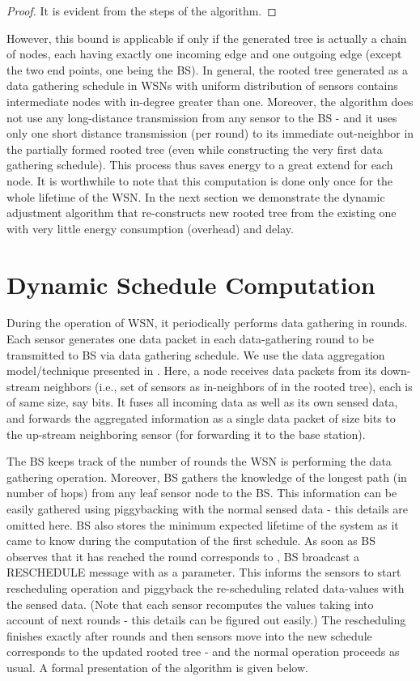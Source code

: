 \documentclass[10pt]{llncs}
\begin{document}
\begin{proof}
It is evident from the steps of the algorithm.
\end{proof}

However, this  bound is applicable if only if the generated tree is actually a chain of  nodes, each having exactly one incoming edge and one outgoing edge (except the two end points, one being the BS). In general, the rooted tree generated as a data gathering schedule in WSNs with uniform distribution of sensors contains intermediate nodes with in-degree greater than one. Moreover, the algorithm does not use any long-distance transmission from any sensor to the BS - and it uses only one short distance transmission (per round) to its immediate out-neighbor in the partially formed rooted tree (even while constructing the very first data gathering schedule). This process thus saves energy to a great extend for each node. It is worthwhile to note that this computation is done only once for the whole lifetime of the WSN. In the next section we demonstrate the dynamic adjustment algorithm that re-constructs new rooted tree from the existing one with very little energy consumption (overhead) and delay. 

\section{Dynamic Schedule Computation}

During the operation of WSN, it periodically performs data gathering in rounds. Each sensor generates one data packet in each data-gathering round to be transmitted to BS via data gathering schedule. We use the data aggregation model/technique presented in \cite{Lindsey02}. Here, a node  receives data packets from its down-stream neighbors (i.e., set of sensors as in-neighbors of  in the rooted tree), each is of same size, say  bits. It fuses all incoming data as well as its own sensed data, and forwards the aggregated information as a single data packet of size  bits to the up-stream neighboring sensor  (for forwarding it to the base station).

The BS keeps track of the number of rounds the WSN is performing the data gathering operation. Moreover, BS gathers the knowledge of the longest path  (in number of hops) from any leaf sensor node to the BS. This information can be easily gathered using piggybacking with the normal sensed data - this details are omitted here. BS also stores the minimum expected lifetime  of the system as it came to know during the computation of the first schedule. As soon as BS observes that it has reached the round corresponds to , BS broadcast a RESCHEDULE message with  as a parameter. This informs the sensors to start rescheduling operation and piggyback the re-scheduling related data-values with the sensed data. (Note that each sensor recomputes the  values taking into account of next  rounds - this details can be figured out easily.) The rescheduling finishes exactly after  rounds and then sensors move into the new schedule corresponds to the updated rooted tree - and the normal operation proceeds as usual. A formal presentation of the algorithm is given below.
\end{document}

